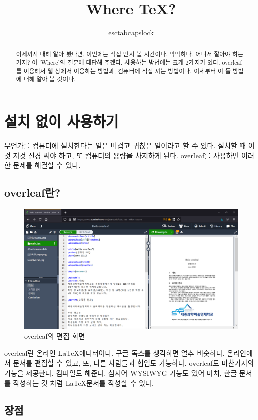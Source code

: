 \documentclass[chapter, oneside]{oblivoir}
\title{Where \TeX?}
\author{esctabcapslock}
\begin{document}
\maketitle

\begin{abstract}
    이제까지  대해 알아 봤다면, 이번에는 직접  만져 볼 시간이다. 막막하다. 어디서 깔아야 하는 거지? 이 `Where'의 질문에 대답해 주겠다.  사용하는 방법에는 크게 2가지가 있다. overleaf를 이용해서 웹 상에서  이용하는 방법과, 컴퓨터에 직접  까는 방법이다. 이제부터 이 들 방법에 대해 알아 볼 것이다.
\end{abstract}

\section{설치 없이 사용하기}
무언가를 컴퓨터에 설치한다는 일은 버겁고 귀찮은 일이라고 할 수 있다. 설치할 때 이것 저것 신경 써야 하고, 또 컴퓨터의 용량을 차지하게 된다. overleaf를 사용하면 이러한 문제를 해결할 수 있다.

\subsection{overleaf란?}
\begin{figure}[h!]
\centering
\includegraphics[width=.7\textwidth]{img/5/overleaf.edit.png}
\caption{overleaf의 편집 화면}
\label{overleaf:edit}
\end{figure}

overleaf란 온라인 \LaTeX 에디터이다. 구글 독스를 생각하면 얼추 비슷하다. 온라인에서 문서를 편집할 수 있고, 또, 다른 사람들과 협업도 가능하다. overleaf도 마찬가지의 기능을 제공한다. 컴파일도 해준다. 심지어 WYSIWYG 기능도 있어 마치, 한글 문서를 작성하는 것 처럼 \LaTeX 문서를 작성할 수 있다.

\subsection{장점}
\end{document}
